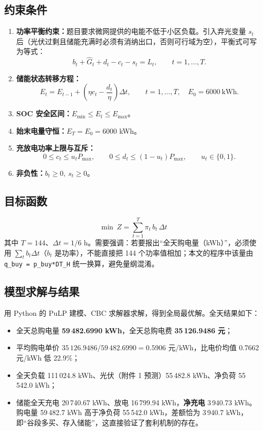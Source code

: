 \documentclass{cumcmthesis}
\begin{document}
\subsection{约束条件}
\begin{enumerate}
    \item \textbf{功率平衡约束：}题目要求微网提供的电能不低于小区负载。引入弃光变量 $s_t$ 后（光伏过剩且储能充满时必须有消纳出口，否则可行域为空），平衡式可写为等式：
    \begin{equation}
        b_t+\hat G_t+d_t-c_t-s_t = L_t, \qquad t=1,\dots,T.
    \end{equation}
    \item \textbf{储能状态转移方程：}
    \begin{equation}
        E_t=E_{t-1}+\left(\eta c_t-\frac{d_t}{\eta}\right)\Delta t,\qquad t=1,\dots,T,\quad E_0=6000\ \text{kWh}.
    \end{equation}
    \item \textbf{SOC 安全区间：}$E_{\min}\le E_t\le E_{\max}$。
    \item \textbf{始末电量守恒：}$E_T=E_0=6000$ kWh。
    \item \textbf{充放电功率上限与互斥：}
    \begin{equation}
        0\le c_t\le u_t P_{\max},\qquad 0\le d_t\le (1-u_t)P_{\max},\qquad u_t\in\{0,1\}.
    \end{equation}
    \item \textbf{非负性：}$b_t\ge0,\ s_t\ge0$。
\end{enumerate}

\subsection{目标函数}
\begin{equation}
    \min\ Z=\sum_{t=1}^{T}\pi_t\, b_t\,\Delta t
    \label{eq:q1_obj}
\end{equation}
其中 $T=144$、$\Delta t=1/6$ h。需要强调：若要报出“全天购电量（kWh）”，必须使用 $\sum_t b_t\Delta t$（$b_t$ 是功率），不能直接把 144 个功率值相加；本文的程序中该量由 \texttt{q\_buy\ =\ p\_buy*DT\_H} 统一换算，避免量纲混淆。

\subsection{模型求解与结果}
用 Python 的 PuLP 建模、CBC 求解器求解，得到全局最优解。全天结果如下：

\begin{itemize}
    \item 全天总购电量 \textbf{59\,482.6990 kWh}，全天总购电费 \textbf{35\,126.9486 元}；
    \item 平均购电单价 $35\,126.9486/59\,482.6990=0.5906$ 元/kWh，比电价均值 0.7662 元/kWh 低 22.9\%；
    \item 全天负载 111\,024.8 kWh、光伏（附件 1 预测）55\,482.8 kWh、净负荷 55\,542.0 kWh；
    \item 储能全天充电 20\,740.67 kWh、放电 16\,799.94 kWh，\textbf{净充电} 3\,940.73 kWh。购电量 59\,482.7 kWh 高于净负荷 55\,542.0 kWh，差额恰为 3\,940.7 kWh，即“谷段多买、存入储能”，这直接验证了套利机制的存在。
\end{itemize}
\end{document}
